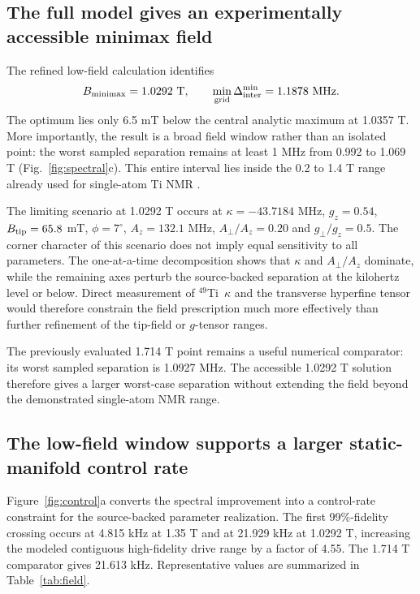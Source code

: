 \documentclass[11pt]{article}
\newcommand{\Ti}{$^{49}$Ti}
\newcommand{\DeltaInter}{\Delta_{\mathrm{inter}}^{\min}}
\begin{document}
\subsection{The full model gives an experimentally accessible minimax field}
The refined low-field calculation identifies
\begin{equation}
B_{\rm minimax}=1.0292\ {\rm T},\qquad \min_{\rm grid}\DeltaInter=1.1878\ {\rm MHz}.
\end{equation}
The optimum lies only 6.5 mT below the central analytic maximum at 1.0357 T. More importantly, the result is a broad field window rather than an isolated point: the worst sampled separation remains at least 1 MHz from 0.992 to 1.069 T (Fig.~\ref{fig:spectral}c). This entire interval lies inside the 0.2 to 1.4 T range already used for single-atom Ti NMR \cite{vennema2025}.

The limiting scenario at 1.0292 T occurs at $\kappa=-43.7184$ MHz, $g_z=0.54$, $B_{\rm tip}=65.8$ mT, $\phi=7^\circ$, $A_z=132.1$ MHz, $A_\perp/A_z=0.20$ and $g_\perp/g_z=0.5$. The corner character of this scenario does not imply equal sensitivity to all parameters. The one-at-a-time decomposition shows that $\kappa$ and $A_\perp/A_z$ dominate, while the remaining axes perturb the source-backed separation at the kilohertz level or below. Direct measurement of \Ti\ $\kappa$ and the transverse hyperfine tensor would therefore constrain the field prescription much more effectively than further refinement of the tip-field or $g$-tensor ranges.

The previously evaluated 1.714 T point remains a useful numerical comparator: its worst sampled separation is 1.0927 MHz. The accessible 1.0292 T solution therefore gives a larger worst-case separation without extending the field beyond the demonstrated single-atom NMR range.

\subsection{The low-field window supports a larger static-manifold control rate}
Figure~\ref{fig:control}a converts the spectral improvement into a control-rate constraint for the source-backed parameter realization. The first 99\%-fidelity crossing occurs at 4.815 kHz at 1.35 T and at 21.929 kHz at 1.0292 T, increasing the modeled contiguous high-fidelity drive range by a factor of 4.55. The 1.714 T comparator gives 21.613 kHz. Representative values are summarized in Table~\ref{tab:field}.
\end{document}
